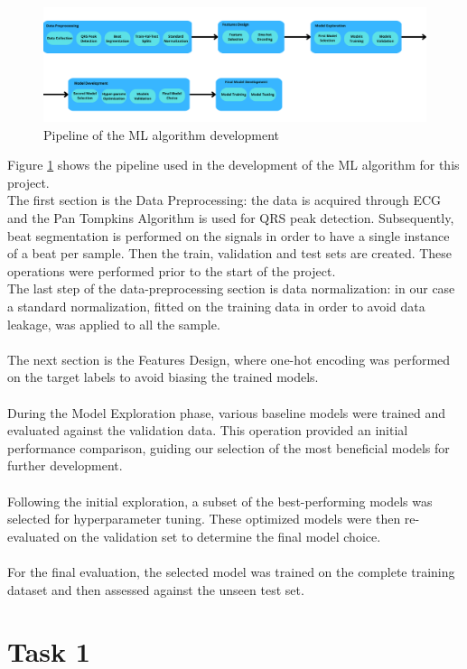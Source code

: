 \documentclass[a4paper,12pt]{article}
\begin{document}
\begin{figure}[h!]
\centering
\includegraphics[width=1\textwidth]{Figs/pipeline.png}
\caption{Pipeline of the ML algorithm development}
\label{fig:pipeline}
\end{figure}
Figure \ref{fig:pipeline} shows the pipeline used in the development of the ML algorithm for this project.\\The first section is the Data Preprocessing: the data is acquired through ECG and the Pan Tompkins Algorithm is used for QRS peak detection. Subsequently, beat segmentation is performed on the signals in order to have a single instance of a beat per sample. Then the train, validation and test sets are created. These operations were performed prior to the start of the project.\\
The last step of the data-preprocessing section is data normalization: in our case a standard normalization, fitted on the training data in order to avoid data leakage, was applied to all the sample.\\\\
The next section is the Features Design, where one-hot encoding was performed on the target labels to avoid biasing the trained models.
\\\\
During the Model Exploration phase, various baseline models were trained and evaluated against the validation data. This operation provided an initial performance comparison, guiding our selection of the most beneficial models for further development.\\\\
Following the initial exploration, a subset of the best-performing models was selected for hyperparameter tuning. These optimized models were then re-evaluated on the validation set to determine the final model choice.
\\\\
For the final evaluation, the selected model was trained on the complete training dataset and then assessed against the unseen test set.

\section*{Task 1}
\end{document}
